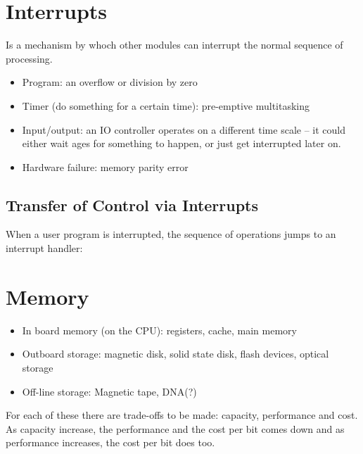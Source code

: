 \section{Interrupts}\label{sec:interrupts}

Is a mechanism by whoch other modules can interrupt the normal sequence of processing.

\begin{itemize}
	\item Program: an overflow or division by zero
	\item Timer (do something for a certain time): pre-emptive multitasking
	\item Input/output: an IO controller operates on a different time scale -- it could either wait ages for something to happen, or just get interrupted later on.
	\item Hardware failure: memory parity error
\end{itemize}

\subsection{Transfer of Control via Interrupts}\label{sub:transfer_of_control_via_interrupts}

When a user program is interrupted, the sequence of operations jumps to an interrupt handler:

\begin{center}
\end{center}

\section{Memory}\label{sec:memory}

\begin{itemize}
	\item In board memory (on the CPU): registers, cache, main memory
	\item Outboard storage: magnetic disk, solid state disk, flash devices, optical storage
	\item Off-line storage: Magnetic tape, DNA(?)
\end{itemize}
%
For each of these there are trade-offs to be made: capacity, performance and cost.
As capacity increase, the performance and the cost per bit comes down and as performance increases, the cost per bit does too.


